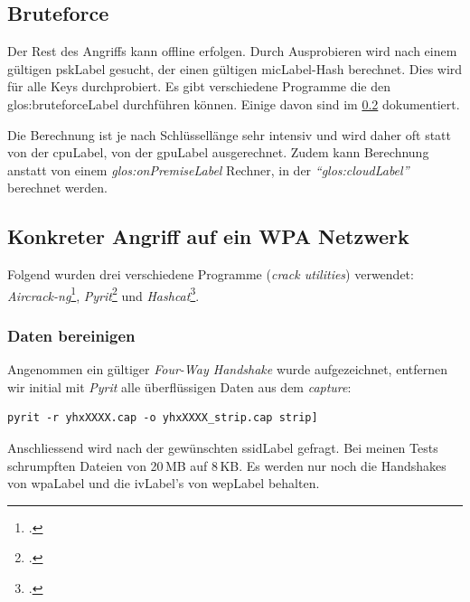 \subsection{Bruteforce}
Der Rest des Angriffs kann offline erfolgen. Durch Ausprobieren wird nach einem gültigen \gls{pskLabel} gesucht, der einen gültigen \gls{micLabel}-Hash berechnet. Dies wird für alle Keys durchprobiert.
Es gibt verschiedene Programme die den \gls{glos:bruteforceLabel} durchführen können.
Einige davon sind im \cref{subsec:wpa_attack_tutorial} dokumentiert.

Die Berechnung ist je nach Schlüssellänge sehr intensiv und wird daher oft statt von der \gls{cpuLabel}, von der \gls{gpuLabel} ausgerechnet.
Zudem kann Berechnung anstatt von einem \textit{\gls{glos:onPremiseLabel}} Rechner, in der \textit{"`\gls{glos:cloudLabel}"'} berechnet werden.


\subsection{Konkreter Angriff auf ein WPA Netzwerk}
\label{subsec:wpa_attack_tutorial}

Folgend wurden drei verschiedene Programme (\textit{crack utilities}) verwendet: \textit{Aircrack-ng}\footcite{Aircrack-ng_2015-04-06}, \textit{Pyrit}\footcite{pyrit_Google_Project_Hosting_2015-04-13} und \textit{Hashcat}\footcite{hashcat_advanced_password_recovery_2015-04-13}.

\subsubsection{Daten bereinigen}
Angenommen ein gültiger \textit{Four-Way Handshake} wurde aufgezeichnet, entfernen wir initial mit \textit{Pyrit} alle überflüssigen Daten aus dem \textit{capture}:
\begin{lstlisting}[style=lstStyleFramed]
pyrit -r yhxXXXX.cap -o yhxXXXX_strip.cap strip]
\end{lstlisting}
Anschliessend wird nach der gewünschten \gls{ssidLabel} gefragt.
Bei meinen Tests schrumpften Dateien von 20\,MB auf 8\,KB.
Es werden nur noch die Handshakes von \gls{wpaLabel} und die \gls{ivLabel}'s von \gls{wepLabel} behalten.

